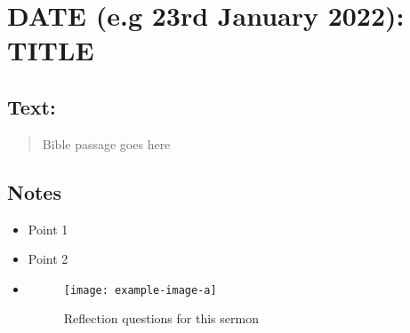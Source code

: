 \setcounter{figure}{0}

\section{DATE (e.g 23rd January 2022): TITLE}
\subsection*{Text: }
  \begin{quote}
    Bible passage goes here
  \end{quote}
\subsection*{Notes}
\begin{itemize}
  \item{Point 1}
  \item{Point 2}
  \item{\begin{figure}[H]
    \centering
    \texttt{[image: example-image-a]}
    \caption[]{Reflection questions for this sermon}
    \label{}
  \end{figure}}
\end{itemize}